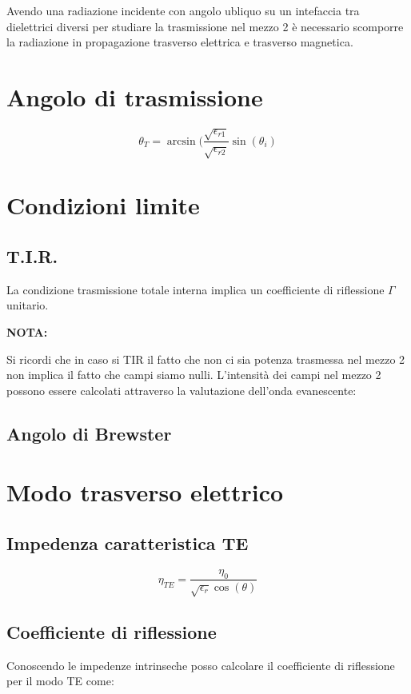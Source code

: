 \documentclass[10pt,a4paper]{report}
\begin{document}
	Avendo una radiazione incidente con angolo ubliquo su un intefaccia tra dielettrici diversi per studiare la trasmissione nel mezzo 2 è necessario scomporre la radiazione in propagazione trasverso elettrica e trasverso magnetica.

	\section{Angolo di trasmissione}

	\begin{equation}
	\theta_T=\arcsin(\frac{\sqrt{\epsilon_{r1}}}{\sqrt{\epsilon_{r2}}}\sin(\theta_i)
	\end{equation} 
	
	\section{Condizioni limite}

		\subsection{T.I.R.}
			La condizione trasmissione totale interna implica un coefficiente di riflessione $\Gamma$ unitario.

			\textbf{NOTA:}

			Si ricordi che in caso si TIR il fatto che non ci sia potenza trasmessa nel mezzo 2 non implica il fatto che campi siamo nulli.
			L'intensità dei campi nel mezzo 2 possono essere calcolati attraverso la valutazione dell'onda evanescente:
		
		\subsection{Angolo di Brewster}

	\section{Modo trasverso elettrico}

		\subsection{Impedenza caratteristica TE}
			\begin{equation}
			\eta_{TE}=\frac{\eta_0}{\sqrt{\epsilon_r}\cos(\theta)}
			\end{equation}

		\subsection{Coefficiente di riflessione}
			Conoscendo le impedenze intrinseche posso calcolare il coefficiente di riflessione per il modo TE come:
\end{document}
